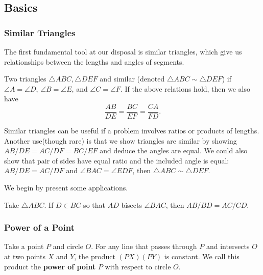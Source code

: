 \documentclass[11pt]{article}
\renewcommand{\>}{\rangle}
\newcommand{\<}{\langle}
\begin{document}
\subsection{Basics}
\subsubsection{Similar Triangles}
The first fundamental tool at our disposal is similar triangles, which give us relationships between the lengths and angles of segments.  \begin{definition} Two triangles $\triangle ABC, \triangle DEF$ and similar (denoted $\triangle ABC \sim \triangle DEF$) if $\angle A = \angle D$, $\angle B = \angle E$, and $\angle C = \angle F$.  If the above relations hold, then we also have
$$\frac{AB}{DE} = \frac{BC}{EF} = \frac{CA}{FD}.$$
\end{definition}

Similar triangles can be useful if a problem involves ratios or products of lengths.  Another use(though rare) is that we show triangles are similar by showing $AB/DE = AC/DF = BC/EF$ and deduce the angles are equal.  We could also show that pair of sides have equal ratio and the included angle is equal: $AB/DE = AC/DF$ and $\angle BAC = \angle EDF$, then $\triangle ABC \sim \triangle DEF$.

We begin by present some applications.
\begin{theorem} Take $\triangle ABC$.  If $D \in BC$ so that $AD$ bisects $\angle BAC$, then $AB/BD = AC/CD$.
\end{theorem}


\subsubsection{Power of a Point}
\begin{theorem} Take a point $P$ and circle $O$.  For any line that passes through $P$ and intersects $O$ at two points $X$ and $Y$, the product $(PX)(PY)$ is constant.  We call this product the \textbf{power of point} $P$ with respect to circle $O$.  
 \end{theorem}
\end{document}
